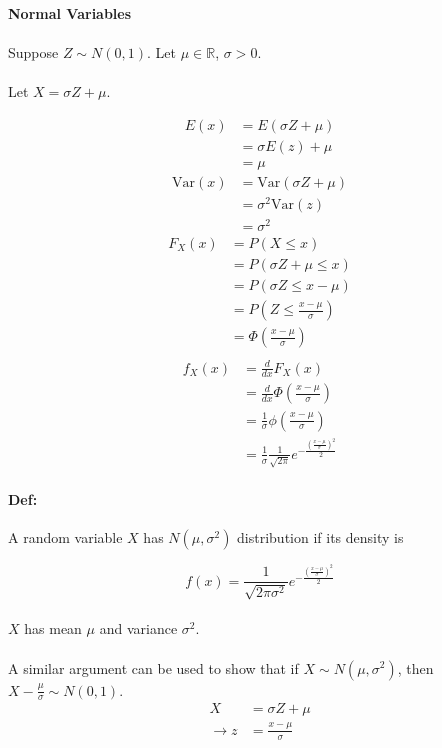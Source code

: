 \documentclass[letterpaper,12pt]{article}
\begin{document}
\paragraph{Normal Variables}
\paragraph{}Suppose $Z \sim N(0,1)$. Let $\mu \in \mathbb{R}$, $\sigma > 0$.

\paragraph{}Let $X = \sigma Z + \mu$.

\begin{align*}
    E(x) &= E(\sigma Z + \mu)\\
         &= \sigma E(z)+ \mu \\ 
         &= \mu
\end{align*}
\begin{align*}
    \mathrm{Var}(x) &= \mathrm{Var}(\sigma Z + \mu)\\
                    &= \sigma^2 \mathrm{Var}(z)\\
                    &= \sigma^2
\end{align*}
\begin{align*}
    F_X(x) &= P(X \le x)\\
           &= P(\sigma Z + \mu \le x)\\
           &= P(\sigma Z \le x - \mu)\\
           &= P(Z \le \frac{x-\mu}{\sigma})\\
           &= \Phi(\frac{x-\mu}{\sigma})\\
\end{align*}
\begin{align*}
    f_X(x) &= \frac{d}{dx} F_X(x)\\
           &= \frac{d}{dx} \Phi(\frac{x-\mu}{\sigma})\\
           &= \frac{1}{\sigma} \phi(\frac{x-\mu}{\sigma})\\
           &= \frac{1}{\sigma} \frac{1}{\sqrt{2\pi}}e^{-\frac{(\frac{x-\mu}{\sigma})^2}{2}}
\end{align*}
\paragraph{Def:}A random variable $X$ has $N(\mu, \sigma^2)$ distribution if its density is

\[
    f(x) = \frac{1}{\sqrt{2\pi\sigma^2}}e^{-\frac{(\frac{x-\mu}{\sigma})^2}{2}}
\]
\paragraph{}$X$ has mean $\mu$ and variance $\sigma^2$.
\paragraph{}A similar argument can be used to show that if $X \sim N(\mu, \sigma^2)$, then
$X - \frac{\mu}{\sigma} \sim N(0,1)$.
\begin{align*}
    X &= \sigma Z + \mu \\
    \to z &= \frac{x-\mu}{\sigma}
\end{align*}
\end{document}
